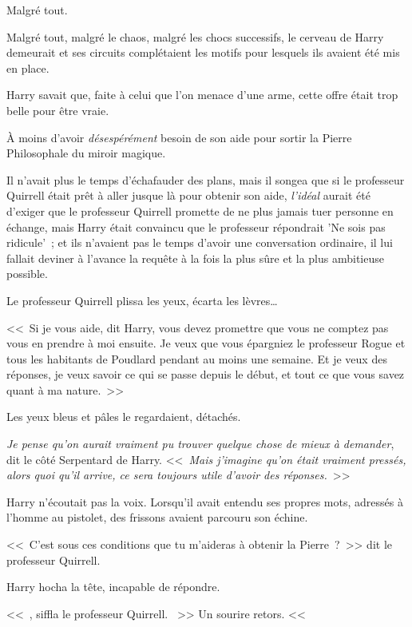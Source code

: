 \later

Malgré tout.

Malgré tout, malgré le chaos, malgré les chocs successifs, le cerveau de Harry demeurait et ses circuits complétaient les motifs pour lesquels ils avaient été mis en place.

Harry savait que, faite à celui que l'on menace d'une arme, cette offre était trop belle pour être vraie.

À moins d'avoir \emph{désespérément} besoin de son aide pour sortir la Pierre Philosophale du miroir magique.

Il n'avait plus le temps d'échafauder des plans, mais il songea que si le professeur Quirrell était prêt à aller jusque là pour obtenir son aide, \emph{l'idéal} aurait été d'exiger que le professeur Quirrell promette de ne plus jamais tuer personne en échange, mais Harry était convaincu que le professeur répondrait 'Ne sois pas ridicule'~; et ils n'avaient pas le temps d'avoir une conversation ordinaire, il lui fallait deviner à l'avance la requête à la fois la plus sûre et la plus ambitieuse possible.

Le professeur Quirrell plissa les yeux, écarta les lèvres…

<<~Si je vous aide, dit Harry, vous devez promettre que vous ne comptez pas vous en prendre à moi ensuite. Je veux que vous épargniez le professeur Rogue et tous les habitants de Poudlard pendant au moins une semaine. Et je veux des réponses, je veux savoir ce qui se passe depuis le début, et tout ce que vous savez quant à ma nature.~>>

Les yeux bleus et pâles le regardaient, détachés.

\emph{Je pense qu'on aurait vraiment pu trouver quelque chose de mieux à demander}, dit le côté Serpentard de Harry. <<~\emph{Mais j'imagine qu'on était vraiment pressés, alors quoi qu'il arrive, ce sera toujours utile d'avoir des réponses.}~>>

Harry n'écoutait pas la voix. Lorsqu'il avait entendu ses propres mots, adressés à l'homme au pistolet, des frissons avaient parcouru son échine.

<<~C'est sous ces conditions que tu m'aideras à obtenir la Pierre~?~>> dit le professeur Quirrell.

Harry hocha la tête, incapable de répondre.

<<~, siffla le professeur Quirrell. ~>> Un sourire retors. <<~

